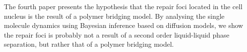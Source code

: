 The fourth paper presents the hypothesis that the repair foci located in the cell nucleus is the result of a polymer bridging model. By analysing the single molecule dynamics using Bayesian inference based on diffusion models, we show the repair foci is probably not a result of a second order liquid-liquid phase
separation, but rather that of a polymer bridging model.

